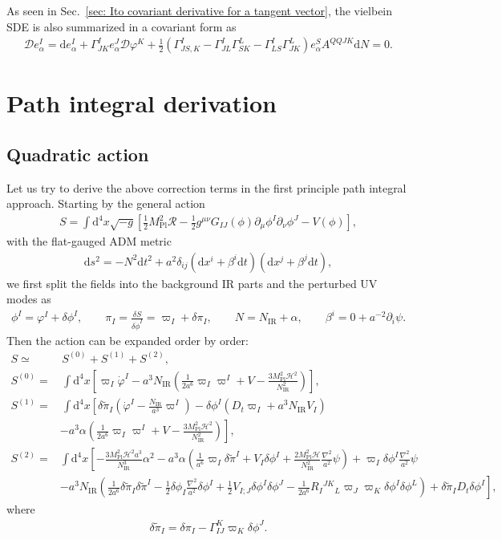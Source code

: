\documentclass[aps, prd
, preprint
, nofootinbib 
, longbibliography
]{revtex4-1}
\newcommand{\dd}{\mathrm{d}}
\newcommand{\Mpl}{M_\mathrm{Pl}}
\newcommand{\IR}{\mathrm{IR}}
\newcommand{\calD}{\mathcal{D}}
\newcommand{\calH}{\mathcal{H}}
\newcommand{\calR}{\mathcal{R}}
\newcommand{\bae}[1]{\begin{align} #1 \end{align}}
\begin{document}
As seen in Sec.~\ref{sec: Ito covariant derivative for a tangent vector}, the vielbein SDE is also summarized in a covariant form as
\bae{
    \calD e^I_\alpha=\dd e^I_\alpha+\Gamma^I_{JK}e^J_\alpha\calD\varphi^K+\frac{1}{2}(\Gamma^I_{JS,K}-\Gamma^I_{JL}\Gamma^L_{SK}-\Gamma^I_{LS}\Gamma^L_{JK})e^S_\alpha A^{QQJK}\dd N=0.
}




\section{Path integral derivation}

\subsection{Quadratic action}

Let us try to derive the above correction terms in the first principle path integral approach.
Starting by the general action
\bae{
    S=\int\dd^4x\sqrt{-g}\left[\frac{1}{2}\Mpl^2\calR-\frac{1}{2}g^{\mu\nu}G_{IJ}(\phi)\partial_\mu\phi^I\partial_\nu\phi^J-V(\phi)\right],
}
with the flat-gauged ADM metric
\bae{
    \dd s^2=-N^2\dd t^2+a^2\delta_{ij}(\dd x^i+\beta^i\dd t)(\dd x^j+\beta^j\dd t),
}
we first split the fields into the background IR parts and the perturbed UV modes as
\bae{
    \phi^I=\varphi^I+\delta\phi^I, \qquad \pi_I=\frac{\delta S}{\delta\dot{\phi}^I}=\varpi_I+\delta\pi_I, \qquad N=N_\IR+\alpha, \qquad \beta^i=0+a^{-2}\partial_i\psi.
}
Then the action can be expanded order by order:
\bae{
    S\simeq&\, S^{(0)}+S^{(1)}+S^{(2)}, \\
    S^{(0)}=&\,\int\dd^4x\left[\varpi_I\dot{\varphi}^I-a^3N_\IR\left(\frac{1}{2a^6}\varpi_I\varpi^I+V-\frac{3\Mpl^2\calH^2}{N_\IR^2}\right)\right], \\
    S^{(1)}=&\,\int\dd^4x\left[\delta\tilde{\pi}_I\left(\dot{\varphi}^I-\frac{N_\IR}{a^3}\varpi^I\right)-\delta\phi^I\left(D_t\varpi_I+a^3N_\IR V_I\right)\right. \nonumber \\
    &\left.-a^3\alpha\left(\frac{1}{2a^6}\varpi_I\varpi^I+V-\frac{3\Mpl^2\calH^2}{N_\IR^2}\right)\right], \\
    S^{(2)}=&\int\dd^4x\left[-\frac{3\Mpl^2\calH^2a^3}{N_\IR^3}\alpha^2-a^3\alpha\left(\frac{1}{a^6}\varpi_I\delta\tilde{\pi}^I+V_I\delta\phi^I+\frac{2\Mpl^2\calH}{N_\IR^2}\frac{\nabla^2}{a^2}\psi\right)+\varpi_I\delta\phi^I\frac{\nabla^2}{a^2}\psi\right. \nonumber \\
    &\left.-a^3N_\IR\left(\frac{1}{2a^6}\delta\tilde{\pi}_I\delta\tilde{\pi}^I-\frac{1}{2}\delta\phi_I\frac{\nabla^2}{a^2}\delta\phi^I+\frac{1}{2}V_{I;J}\delta\phi^I\delta\phi^J-\frac{1}{2a^6}R_I{}^{JK}{}_L\varpi_J\varpi_K\delta\phi^I\delta\phi^L\right)+\delta\tilde{\pi}_ID_t\delta\phi^I\right],
}
where
\bae{
    \delta\tilde{\pi}_I=\delta\pi_I-\Gamma^K_{IJ}\varpi_K\delta\phi^J.
}
\end{document}
